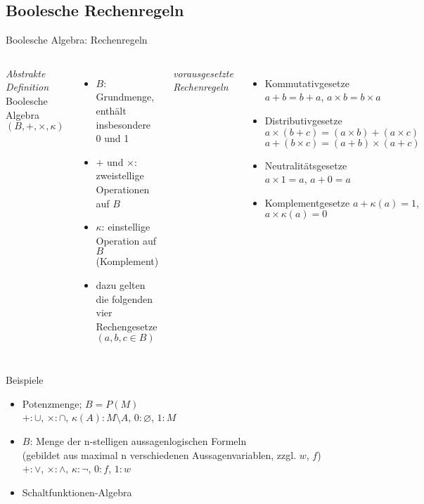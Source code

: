 \subsection{Boolesche Rechenregeln}

\begin{frame}{Boolesche Algebra: Rechenregeln}
	\begin{columns}
		\emph{Abstrakte Definition}\\
		Boolesche Algebra $(B, +, \times, \kappa)$
		\begin{itemize}
			\item $B$: Grundmenge, enthält insbesondere 0 und 1
			\item $+$ und $\times$: zweistellige Operationen auf $B$
			\item $\kappa$: einstellige Operation auf $B$ (Komplement)
			\item dazu gelten die folgenden vier Rechengesetze $(a,b,c\in B)$
		\end{itemize}
		\emph{vorausgesetzte Rechenregeln}\\
		\begin{itemize}
			\item Kommutativgesetze\\
				$a+b=b+a$, $a \times b=b \times a$
			\item Distributivgesetze\\
				$a \times (b + c) = (a \times b) + (a\times c)$\\
				$a + (b \times c) = (a + b) \times (a + c)$\\
			\item Neutralitätsgesetze\\
				$a \times 1 = a$, $a + 0 = a$
			\item Komplementgesetze
				$a + \kappa(a) = 1$, $a \times \kappa(a) = 0$
		\end{itemize}
	\end{columns}		
\end{frame}


\begin{frame}{Beispiele}
	\begin{itemize}
		\item Potenzmenge; $B=P(M)$\\
			$+:\cup$, $\times:\cap$, $\kappa(A):M\setminus A$, $0:\varnothing$, $1:M$
		\item $B$: Menge der n-stelligen aussagenlogischen Formeln\\
			(gebildet aus maximal n verschiedenen Aussagenvariablen, zzgl. $w$, $f$)\\
			$+:\lor$, $\times:\land$, $\kappa:\neg$, $0:f$, $1:w$
		\item Schaltfunktionen-Algebra
	\end{itemize}
\end{frame}

